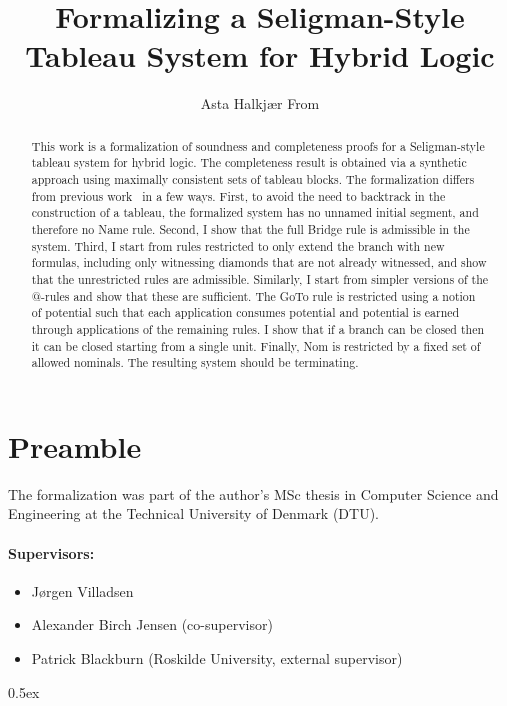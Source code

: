 \documentclass[11pt,a4paper]{article}
\begin{document}
\title{Formalizing a Seligman-Style Tableau System for Hybrid Logic}
\author{Asta Halkjær From}
\maketitle

\begin{abstract}
This work is a formalization of soundness and completeness proofs
for a Seligman-style tableau system for hybrid logic. The completeness
result is obtained via a synthetic approach using maximally
consistent sets of tableau blocks. The formalization differs from
previous work~\cite{jlog17, aiml16} in a few ways. First, to avoid the need to backtrack in
the construction of a tableau, the formalized system has no unnamed
initial segment, and therefore no Name rule. Second, I show that the
full Bridge rule is admissible in the system. Third, I start from rules
restricted to only extend the branch with new formulas, including only
witnessing diamonds that are not already witnessed, and show that
the unrestricted rules are admissible. Similarly, I start from simpler
versions of the @-rules and show that these are sufficient.
The GoTo rule is restricted using a notion of potential such that each
application consumes potential and potential is earned through applications of
the remaining rules. I show that if a branch can be closed then it can
be closed starting from a single unit. Finally, Nom is restricted by
a fixed set of allowed nominals. The resulting system should be terminating.
\end{abstract}

\section*{Preamble}

The formalization was part of the author's MSc thesis in Computer Science and Engineering at the Technical University of Denmark (DTU).

\paragraph{Supervisors:}

\begin{itemize}
  \item Jørgen Villadsen
  \item Alexander Birch Jensen (co-supervisor)
  \item Patrick Blackburn (Roskilde University, external supervisor)
\end{itemize}

\newpage
\tableofcontents

\newpage

\parindent 0pt\parskip 0.5ex



\nocite{*}




\end{document}
